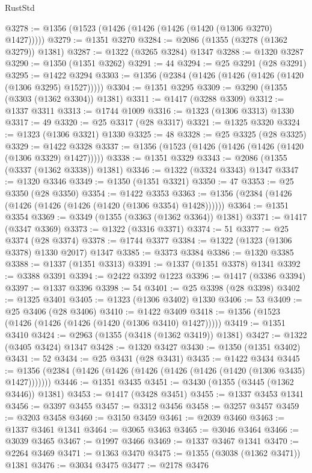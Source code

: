 \begin{lexlean}{RustStd}
\begin{coremodule}
{\begin{coremodule}
{{{{{{{{{{{{{{{{{{{{{{{{{{{{{{{{{{@3278 := @1356 (@1523 (@1426 (@1426 (@1426 (@1420 (@1306 @3270) @1427)))))
@3279 := @1351 @3270
@3284 := @2086 (@1355 (@3278 (@1362 @3279)) @1381)
@3287 := @1322 (@3265 @3284) @1347
@3288 := @1320 @3287
@3290 := @1350 (@1351 @3262)
@3291 := 44
@3294 := @25 @3291 (@28 @3291)
@3295 := @1422 @3294
@3303 := @1356 (@2384 (@1426 (@1426 (@1426 (@1420 (@1306 @3295) @1527)))))
@3304 := @1351 @3295
@3309 := @3290 (@1355 (@3303 (@1362 @3304)) @1381)
@3311 := @1417 (@3288 @3309)
@3312 := @1337 @3311
@3313 := @1744 @1009
@3316 := @1323 (@1306 @3313) @1330
@3317 := 49
@3320 := @25 @3317 (@28 @3317)
@3321 := @1325 @3320
@3324 := @1323 (@1306 @3321) @1330
@3325 := 48
@3328 := @25 @3325 (@28 @3325)
@3329 := @1422 @3328
@3337 := @1356 (@1523 (@1426 (@1426 (@1426 (@1420 (@1306 @3329) @1427)))))
@3338 := @1351 @3329
@3343 := @2086 (@1355 (@3337 (@1362 @3338)) @1381)
@3346 := @1322 (@3324 @3343) @1347
@3347 := @1320 @3346
@3349 := @1350 (@1351 @3321)
@3350 := 47
@3353 := @25 @3350 (@28 @3350)
@3354 := @1422 @3353
@3363 := @1356 (@2384 (@1426 (@1426 (@1426 (@1426 (@1420 (@1306 @3354) @1428))))))
@3364 := @1351 @3354
@3369 := @3349 (@1355 (@3363 (@1362 @3364)) @1381)
@3371 := @1417 (@3347 @3369)
@3373 := @1322 (@3316 @3371)
@3374 := 51
@3377 := @25 @3374 (@28 @3374)
@3378 := @1744 @3377
@3384 := @1322 (@1323 (@1306 @3378) @1330 @2017) @1347
@3385 := @3373 @3384
@3386 := @1320 @3385
@3388 := @1337 (@1351 @3313)
@3391 := @1337 (@1351 @3378) @1341
@3392 := @3388 @3391
@3394 := @2422 @3392 @1223
@3396 := @1417 (@3386 @3394)
@3397 := @1337 @3396
@3398 := 54
@3401 := @25 @3398 (@28 @3398)
@3402 := @1325 @3401
@3405 := @1323 (@1306 @3402) @1330
@3406 := 53
@3409 := @25 @3406 (@28 @3406)
@3410 := @1422 @3409
@3418 := @1356 (@1523 (@1426 (@1426 (@1426 (@1420 (@1306 @3410) @1427)))))
@3419 := @1351 @3410
@3424 := @2963 (@1355 (@3418 (@1362 @3419)) @1381)
@3427 := @1322 (@3405 @3424) @1347
@3428 := @1320 @3427
@3430 := @1350 (@1351 @3402)
@3431 := 52
@3434 := @25 @3431 (@28 @3431)
@3435 := @1422 @3434
@3445 := @1356 (@2384 (@1426 (@1426 (@1426 (@1426 (@1426 (@1420 (@1306 @3435) @1427)))))))
@3446 := @1351 @3435
@3451 := @3430 (@1355 (@3445 (@1362 @3446)) @1381)
@3453 := @1417 (@3428 @3451)
@3455 := @1337 @3453 @1341
@3456 := @3397 @3455
@3457 := @3312 @3456
@3458 := @3257 @3457
@3459 := @3203 @3458
@3460 := @3150 @3459
@3461 := @2039 @3460
@3463 := @1337 @3461 @1341
@3464 := @3065 @3463
@3465 := @3046 @3464
@3466 := @3039 @3465
@3467 := @1997 @3466
@3469 := @1337 @3467 @1341
@3470 := @2264 @3469
@3471 := @1363 @3470
@3475 := @1355 (@3038 (@1362 @3471)) @1381
@3476 := @3034 @3475
@3477 := @2178 @3476
}}}}}}}}}}}}}}}}}}}}}}}}}}}}}}}}}}
\end{coremodule}}
\end{coremodule}
\end{lexlean}
